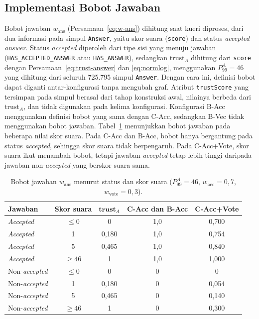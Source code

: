\subsection{Implementasi Bobot Jawaban}
\label{subsec:implementasi-bobot-jawaban}

Bobot jawaban $w_{\mathrm{ans}}$ (Persamaan~\eqref{eq:w-ans}) dihitung saat kueri diproses, dari dua informasi pada simpul \texttt{Answer}, yaitu skor suara (\texttt{score}) dan status \emph{accepted answer}. Status \emph{accepted} diperoleh dari tipe sisi yang menuju jawaban (\texttt{HAS\_ACCEPTED\_ANSWER} atau \texttt{HAS\_ANSWER}), sedangkan $\mathrm{trust}_A$ dihitung dari \texttt{score} dengan Persamaan~\eqref{eq:trust-answer} dan \eqref{eq:normlog}, menggunakan $P_{99}^{A}=46$ yang dihitung dari seluruh 725.795 simpul \texttt{Answer}. Dengan cara ini, definisi bobot dapat diganti antar-konfigurasi tanpa mengubah graf. Atribut \texttt{trustScore} yang tersimpan pada simpul berasal dari tahap konstruksi awal, nilainya berbeda dari $\mathrm{trust}_A$, dan tidak digunakan pada kelima konfigurasi. Konfigurasi B-Acc menggunakan definisi bobot yang sama dengan C-Acc, sedangkan B-Vec tidak menggunakan bobot jawaban. Tabel~\ref{tab:bobot-jawaban} menunjukkan bobot jawaban pada beberapa nilai skor suara. Pada C-Acc dan B-Acc, bobot hanya bergantung pada status \emph{accepted}, sehingga skor suara tidak berpengaruh. Pada C-Acc+Vote, skor suara ikut menambah bobot, tetapi jawaban \emph{accepted} tetap lebih tinggi daripada jawaban non-\emph{accepted} yang berskor suara sama.

\begin{table}[!htbp]
\centering
\small
\caption{Bobot jawaban $w_{\mathrm{ans}}$ menurut status dan skor suara ($P_{99}^{A}=46$, $w_{\mathrm{acc}}=0{,}7$, $w_{\mathrm{vote}}=0{,}3$).}
\label{tab:bobot-jawaban}
\renewcommand{\arraystretch}{1.2}
\begin{tabular}{|l|c|c|c|c|}
\hline
\textbf{Jawaban} & \textbf{Skor suara} & $\mathbf{trust}_A$ & \textbf{C-Acc dan B-Acc} & \textbf{C-Acc+Vote} \\
\hline
\emph{Accepted} & $\leq 0$ & 0 & 1,0 & 0,700 \\
\emph{Accepted} & 1 & 0,180 & 1,0 & 0,754 \\
\emph{Accepted} & 5 & 0,465 & 1,0 & 0,840 \\
\emph{Accepted} & $\geq 46$ & 1 & 1,0 & 1,000 \\
\hline
Non-\emph{accepted} & $\leq 0$ & 0 & 0 & 0 \\
Non-\emph{accepted} & 1 & 0,180 & 0 & 0,054 \\
Non-\emph{accepted} & 5 & 0,465 & 0 & 0,140 \\
Non-\emph{accepted} & $\geq 46$ & 1 & 0 & 0,300 \\
\hline
\end{tabular}
\end{table}

